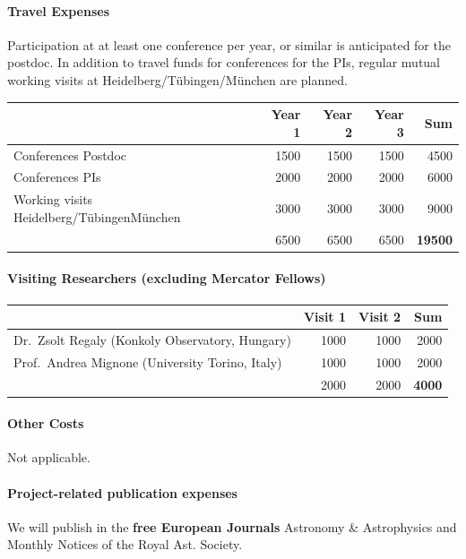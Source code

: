 \documentclass[10pt,fleqn,twoside]{article}
\begin{document}
\paragraph{Travel Expenses}
Participation at at least one conference per year, or similar is anticipated
for the postdoc. In addition to travel funds for conferences for the PIs,
regular mutual working visits at Heidelberg/T\"ubingen/M\"unchen are
planned.

\begin{center}
\begin{tabular}{l|r|r|r|r}
& Year 1 & Year 2 & Year 3 & Sum \\
\hline\hline
Conferences Postdoc                       	& 1500	& 1500 & 1500 & 4500\\
Conferences PIs                                 & 2000	& 2000 & 2000 & 6000\\
Working visits Heidelberg/T\"ubingenM\"unchen   & 3000	& 3000 & 3000 & 9000\\
\hline
  & 6500 & 6500 & 6500 & {\bf 19500}\\
\end{tabular}
\end{center}

\paragraph{Visiting Researchers (excluding Mercator Fellows)}

\begin{center}
\begin{tabular}{l|r|r|r}
& Visit 1 & Visit 2 & Sum \\
\hline\hline
Dr.\ Zsolt Regaly (Konkoly Observatory, Hungary)  & 1000 & 1000 & 2000 \\
Prof.\ Andrea Mignone (University Torino, Italy)  & 1000 & 1000 & 2000 \\
\hline
  & 2000 & 2000 & {\bf 4000}\\
\end{tabular}
\end{center}

\paragraph{Other Costs}

Not applicable.

\paragraph{Project-related publication expenses}
We will publish in the {\bf free European Journals} Astronomy \& Astrophysics and Monthly Notices of the Royal Ast. Society.
\end{document}
